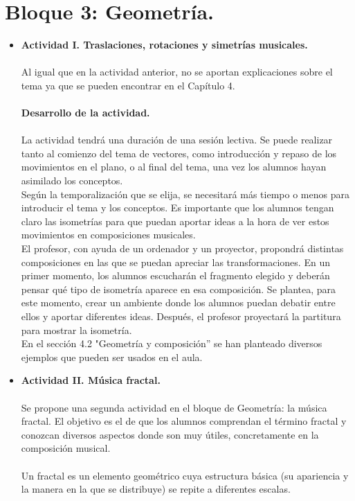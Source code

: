 \documentclass[a4paper, openright, 11pt, titlepage]{report}
\theoremstyle{definition}\newtheorem{defin}[propo]{Definition}
\theoremstyle{definition}\newtheorem{obser}[propo]{Remark}
\theoremstyle{definition}\newtheorem{ejem}[propo]{Ejemplo}
\theoremstyle{definition}\newtheorem{algoritmo}[propo]{Algoritmo}
\begin{document}
\section{Bloque 3: Geometría.}
\begin{itemize}
    \item \textbf{Actividad I. Traslaciones, rotaciones y simetrías musicales.}\\\\
    Al igual que en la actividad anterior, no se aportan explicaciones sobre el tema ya que se pueden encontrar en el Capítulo 4.\\\\
    \textbf{Desarrollo de la actividad.}\\\\
    La actividad tendrá una duración de una sesión lectiva. Se puede realizar tanto al comienzo del tema de vectores, como introducción y repaso de los movimientos en el plano, o al final del tema, una vez los alumnos hayan asimilado los conceptos.\\
    Según la temporalización que se elija, se necesitará más tiempo o menos para introducir el tema y los conceptos. Es importante que los alumnos tengan claro las isometrías para que puedan aportar ideas a la hora de ver estos movimientos en composiciones musicales.\\
    El profesor, con ayuda de un ordenador y un proyector, propondrá distintas composiciones en las que se puedan apreciar las transformaciones. En un primer momento, los alumnos escucharán el fragmento elegido y deberán pensar qué tipo de isometría aparece en esa composición. Se plantea, para este momento, crear un ambiente donde los alumnos puedan debatir entre ellos y aportar diferentes ideas. Después, el profesor proyectará la partitura para mostrar la isometría.\\
    En el sección 4.2 "Geometría y composición'' se han planteado diversos ejemplos que pueden ser usados en el aula.
    \item \textbf{Actividad II. Música fractal.}\\\\
    Se propone una segunda actividad en el bloque de Geometría: la música fractal. El objetivo es el de que los alumnos comprendan el término fractal y conozcan diversos aspectos donde son muy útiles, concretamente en la composición musical.\\\\
    Un fractal es un elemento geométrico cuya estructura básica (su apariencia y la manera en la que se distribuye) se repite a diferentes escalas.\\

\end{itemize}
\end{document}
